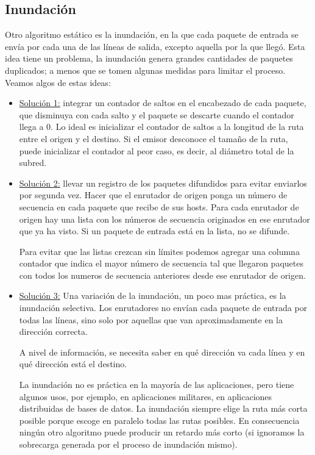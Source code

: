 \subsection{Inundación}
	\par Otro algoritmo estático es la inundación, en la que cada paquete de entrada se 
	envía por cada una de las líneas de salida, excepto aquella por la que llegó.
    Esta idea tiene un problema, la inundación genera grandes cantidades de paquetes 
    duplicados; a menos que se tomen algunas medidas para limitar el proceso. Veamos 
    algos de estas ideas:

	\begin{itemize}
		\item \underline{Solución 1:} integrar un contador de saltos en el encabezado de cada 
		paquete, que disminuya con cada salto y el paquete se descarte cuando el 
		contador llega a 0. Lo ideal es inicializar el contador de saltos a la longitud de la 
		ruta entre el origen y el destino. Si el emisor desconoce el tamaño de la ruta, 
		puede inicializar el contador al peor caso, es decir, al diámetro total de la subred.
		
		\item \underline{Solución 2:} llevar un registro de los paquetes difundidos para evitar 
		enviarlos por segunda vez. Hacer que el enrutador de origen ponga un número de 
		secuencia en cada paquete que recibe de sus hosts. Para cada enrutador de origen 
		hay una lista con los números de secuencia originados en ese enrutador que ya ha 
		visto. Si un paquete de entrada está en la lista, no se difunde.

		\par Para evitar que las listas crezcan sin límites podemos agregar una columna 
		contador que indica el mayor número de secuencia tal que llegaron paquetes con 
		todos los numeros de secuencia anteriores desde ese enrutador de origen.
		
		\item \underline{Solución 3:} Una variación de la inundación, un poco mas práctica, es la 
		inundación selectiva. Los enrutadores no envían cada paquete de entrada por 
		todas las líneas, sino solo por aquellas que van aproximadamente en la dirección 
		correcta.

		\par A nivel de información, se necesita saber en qué  dirección va cada línea y en qué 
		dirección está el destino.
		
		\par La inundación no es práctica en la mayoría de las aplicaciones, pero tiene
		algunos usos, por ejemplo, en aplicaciones militares, en aplicaciones distribuidas 
		de bases de datos. La inundación siempre elige la ruta más corta posible porque 
		escoge en paralelo todas las rutas posibles. En consecuencia ningún otro 
		algoritmo puede producir un retardo más corto (si ignoramos la sobrecarga 
		generada por el proceso de inundación mismo).
		
	\end{itemize}
		
